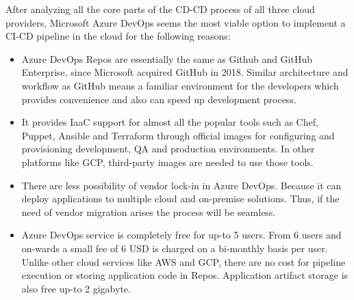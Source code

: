 After analyzing all the core parts of the CD-CD process of all three cloud providers, Microsoft Azure DevOps seems the most viable option to implement a CI-CD pipeline in the cloud for the following reasons: 

\begin{itemize}
    \item Azure DevOps Repos are essentially the same as Github and GitHub Enterprise, since Microsoft acquired GitHub in 2018. Similar architecture and workflow as GitHub means a familiar environment for the developers which provides convenience and also can speed up development process.
    \item It provides IaaC support for almost all the popular tools such as Chef, Puppet, Ansible and Terraform through official images for configuring and provisioning development, QA and production environments. In other platforms like GCP, third-party images are needed to use those tools.
    \item There are less possibility of vendor lock-in in Azure DevOps. Because it can deploy applications to multiple cloud and on-premise solutions. Thus, if the need of vendor migration arises the process will be seamless. 
    \item Azure DevOps service is completely free for up-to 5 users. From 6 users and on-wards a small fee of 6 USD is charged on a bi-monthly basis per user. Unlike other cloud services like AWS and GCP, there are no cost for pipeline execution or storing application code in Repos. Application artifact storage is also free up-to 2 gigabyte. 
\end{itemize}
